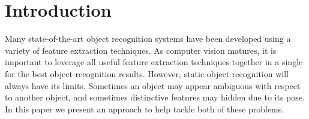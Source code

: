 \documentclass[conference]{IEEEtran}
\newcommand{\figref}[1]{Fig.~\ref{#1}}
\begin{document}
\IEEEpeerreviewmaketitle

\section{Introduction}


    Many state-of-the-art object recognition systems have been developed using a variety of feature extraction techniques. As computer vision matures, it is important to leverage all useful feature extraction techniques together in a single for the best object recognition results. However, static object recognition will always have its limits. Sometimes an object may appear ambiguous with respect to another object, and sometimes distinctive features may hidden due to its pose.  In this paper we present an approach to help tackle both of these problems.


    

    

\end{document}
